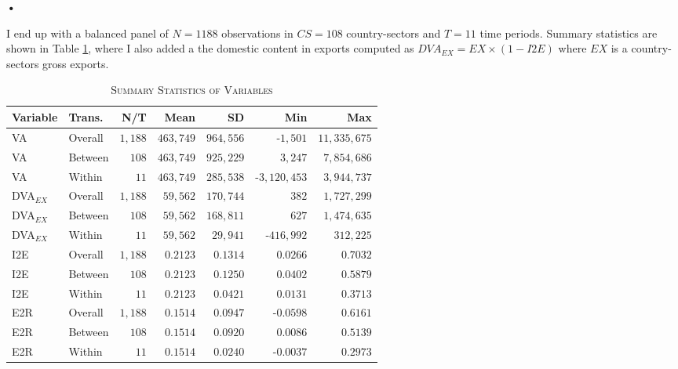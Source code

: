 \textbf{\textbf{•}}\documentclass[a4paper]{article}
\begin{document}
I end up with a balanced panel of $N = 1188$ observations in $CS = 108$ country-sectors and $T = 11$ time periods. Summary statistics are shown in Table \ref{tab:SUMM_GROWTH}, where I also added a the domestic content in exports computed as $DVA_{EX} = EX \times (1 - I2E)$ where $EX$ is a country-sectors gross exports. 

\begin{table}[h!] \centering 
  \caption{\label{tab:SUMM_GROWTH}\textsc{Summary Statistics of Variables}}
  \vspace{2mm}
  \begin{center}
\begin{tabular}{ llrrrrr} \toprule
Variable & Trans. & N/T & Mean & SD & Min & Max \\ \midrule
VA & Overall & $1,188$ & $463,749$ & $964,556$ & -$1,501$ & $11,335,675$ \\ 
VA & Between & $108$ & $463,749$ & $925,229$ & $3,247$ & $7,854,686$ \\ 
VA & Within & $11$ & $463,749$ & $285,538$ & -$3,120,453$ & $3,944,737$ \\ 
DVA$_{EX}$ & Overall & $1,188$ & $59,562$ & $170,744$ & $382$ & $1,727,299$ \\ 
DVA$_{EX}$ & Between & $108$ & $59,562$ & $168,811$ & $627$ & $1,474,635$ \\ 
DVA$_{EX}$ & Within & $11$ & $59,562$ & $29,941$ & -$416,992$ & $312,225$ \\ 
I2E & Overall & $1,188$ & $0.2123$ & $0.1314$ & $0.0266$ & $0.7032$ \\ 
I2E & Between & $108$ & $0.2123$ & $0.1250$ & $0.0402$ & $0.5879$ \\ 
I2E & Within & $11$ & $0.2123$ & $0.0421$ & $0.0131$ & $0.3713$ \\ 
E2R & Overall & $1,188$ & $0.1514$ & $0.0947$ & -$0.0598$ & $0.6161$ \\ 
E2R & Between & $108$ & $0.1514$ & $0.0920$ & $0.0086$ & $0.5139$ \\ 
E2R & Within & $11$ & $0.1514$ & $0.0240$ & -$0.0037$ & $0.2973$ \\ 
\bottomrule
\end{tabular} 
 \end{center}
\end{table} 
\FloatBarrier 
\end{document}
